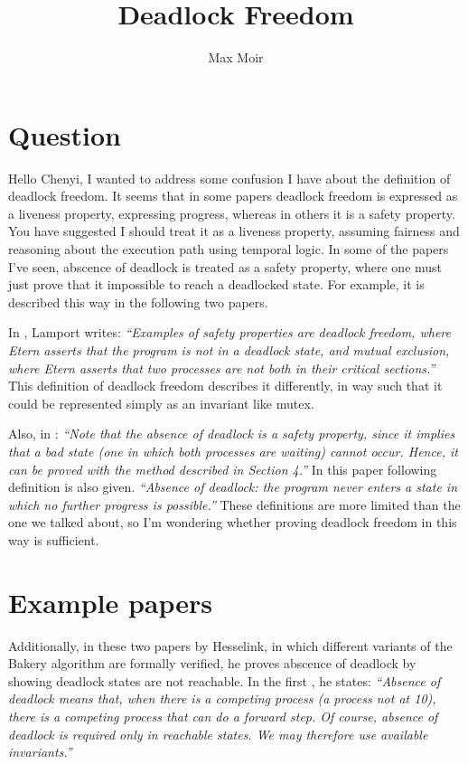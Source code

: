 \documentclass{article}
\title{Deadlock Freedom}
\author{
    Max Moir \\
}
\theoremstyle{definition}
\begin{document}
\maketitle

\section{Question}

Hello Chenyi, I wanted to address some confusion I have about the definition of deadlock freedom.
It seems that in some papers deadlock freedom is expressed as a liveness property,
expressing progress, whereas in others it is a safety property.
You have suggested I should treat it as a liveness property,
assuming fairness and reasoning about the execution path using temporal logic.
In some of the papers I've seen, abscence of deadlock is treated as a safety property,
where one must just prove that it impossible to reach a deadlocked state.
For example, it is described this way in the following two papers.

In \cite{lamportHoareLogicCSP1984}, Lamport writes:
\emph{``Examples of safety properties are deadlock freedom, where Etern asserts that the program is not in a deadlock state, and mutual exclusion, where Etern asserts that two processes are not both in their critical sections.''}
This definition of deadlock freedom describes it differently, in way such that it could 
be represented simply as an invariant like mutex.

Also, in \cite{owickiProvingLivenessProperties1982}:
\emph{``Note that the absence of deadlock is a safety property, since it implies that a bad state (one in which both processes are waiting) cannot occur. Hence, it can be proved with the method described in Section 4.''}
In this paper following definition is also given.
\emph{``Absence of deadlock: the program never enters a state in which no further progress is possible.''}
These definitions are more limited than the one we talked about, so I'm wondering whether proving deadlock 
freedom in this way is sufficient.

\section{Example papers}
Additionally, in these two papers by Hesselink, in which different variants of the 
Bakery algorithm are formally verified, 
he proves abscence of deadlock by showing deadlock states are not reachable.
In the first \cite{hesselinkMechanicalVerificationLamports2013}, he states:
\emph{``Absence of deadlock means that, when there is a competing process (a process not at 10), there is a competing process that can do a forward step. Of course, absence of deadlock is required only in reachable states. We may therefore use available invariants.''}
\end{document}
